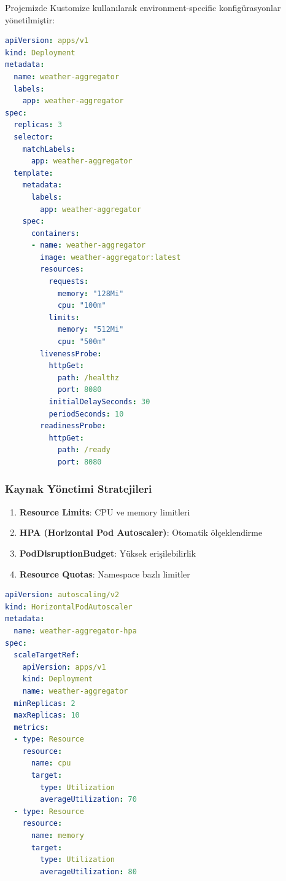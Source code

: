 \documentclass[12pt,a4paper]{article}
\begin{document}
Projemizde Kustomize kullanılarak environment-specific konfigürasyonlar yönetilmiştir:

\begin{lstlisting}[language=yaml, caption=Deployment Manifest]
apiVersion: apps/v1
kind: Deployment
metadata:
  name: weather-aggregator
  labels:
    app: weather-aggregator
spec:
  replicas: 3
  selector:
    matchLabels:
      app: weather-aggregator
  template:
    metadata:
      labels:
        app: weather-aggregator
    spec:
      containers:
      - name: weather-aggregator
        image: weather-aggregator:latest
        resources:
          requests:
            memory: "128Mi"
            cpu: "100m"
          limits:
            memory: "512Mi"
            cpu: "500m"
        livenessProbe:
          httpGet:
            path: /healthz
            port: 8080
          initialDelaySeconds: 30
          periodSeconds: 10
        readinessProbe:
          httpGet:
            path: /ready
            port: 8080
\end{lstlisting}

\subsubsection{Kaynak Yönetimi Stratejileri}

\begin{enumerate}
    \item \textbf{Resource Limits}: CPU ve memory limitleri
    \item \textbf{HPA (Horizontal Pod Autoscaler)}: Otomatik ölçeklendirme
    \item \textbf{PodDisruptionBudget}: Yüksek erişilebilirlik
    \item \textbf{Resource Quotas}: Namespace bazlı limitler
\end{enumerate}

\begin{lstlisting}[language=yaml, caption=HPA Konfigürasyonu]
apiVersion: autoscaling/v2
kind: HorizontalPodAutoscaler
metadata:
  name: weather-aggregator-hpa
spec:
  scaleTargetRef:
    apiVersion: apps/v1
    kind: Deployment
    name: weather-aggregator
  minReplicas: 2
  maxReplicas: 10
  metrics:
  - type: Resource
    resource:
      name: cpu
      target:
        type: Utilization
        averageUtilization: 70
  - type: Resource
    resource:
      name: memory
      target:
        type: Utilization
        averageUtilization: 80
\end{lstlisting}
\end{document}
